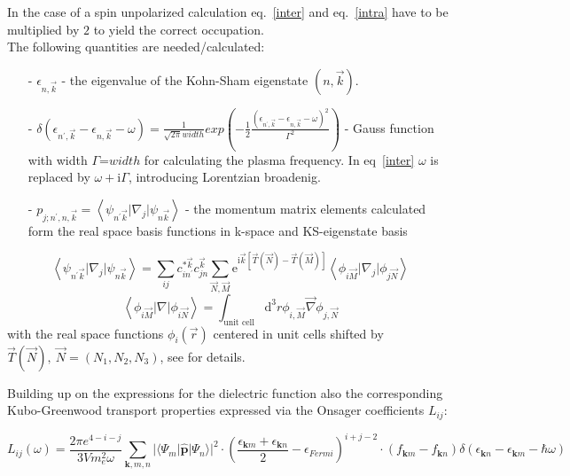 In the case of a spin unpolarized calculation eq.~\ref{inter} and eq.~\ref{intra} have to be multiplied by $2$ to yield the correct occupation.\\
The following quantities are needed/calculated:
\begin{itemize}
 \item[-] $\epsilon_{n,\vec{k}}$ - the eigenvalue of the Kohn-Sham eigenstate $(n,\vec{k})$.
 \item[-] $\delta(\epsilon_{n^{'},\vec{k}}-\epsilon_{n,\vec{k}}-\omega)=\frac{1}{\sqrt{2\pi}width}exp\left(-\frac{1}{2}\frac{(\epsilon_{n^{'},\vec{k}}-\epsilon_{n,\vec{k}}-\omega)^2}{\Gamma^2}\right)$ - Gauss function with width $\Gamma$=$width$ for calculating the plasma frequency. In eq~\ref{inter} $\omega$ is replaced by $\omega+\mathrm{i}\Gamma$, introducing Lorentzian broadenig.
 \item[-] $p_{j;n^{'},n,\vec{k}}=\left\langle\psi_{n^{'}\vec{k}}\vert\nabla_j\vert\psi_{n\vec{k}}\right\rangle$ - the momentum matrix elements calculated form the real space basis 
functions in k-space and KS-eigenstate basis
\end{itemize}
\begin{equation}
 \left\langle\psi_{n^{'}\vec{k}}\vert\nabla_j\vert\psi_{n\vec{k}}\right\rangle=\sum_{ij}c_{in^{'}}^{*\vec{k}}c_{jn}^{\vec{k}}\sum_{\vec{N},\vec{M}}\mathrm{e}^{\mathrm{i}\vec{k}\left[\vec{T}\left(\vec{N}\right)-\vec{T}\left(\vec{M}\right)\right]}\left\langle\phi_{i\vec{M}}\vert\nabla_j\vert\phi_{j\vec{N}}\right\rangle
\end{equation}
\begin{equation}
 \left\langle\phi_{i\vec{M}}\vert\nabla\vert\phi_{i\vec{N}}\right\rangle=\int_{\text{unit cell}}\mathrm{d}^3 r \phi_{i,\vec{M}}\vec{\nabla}\phi_{j,\vec{N}}
\end{equation}
with the real space functions $\phi_i(\vec{r})$ centered in unit cells shifted by $\vec{T}\left(\vec{N}\right),~\vec{N}=(N_1, N_2, N_3)$, see \cite{Blum08} for details.

Building up on the expressions for the dielectric function also the corresponding Kubo-Greenwood transport properties expressed via the Onsager coefficients $L_{ij}$: 

\begin{equation}
 L_{ij}(\omega) = \frac{2\pi e^{4-i-j}}{3V m^2_e \omega} \sum_{\bm{k},m,n} | \langle \Psi_m |\bm{\hat{p}} | \Psi_n \rangle|^2 \cdot   \left( \frac{\epsilon_{\bm{k}m} + \epsilon_{\bm{k}n}}{2} -\epsilon_{Fermi}   \right)^{i+j-2}   \cdot   \left(f_{\bm{k}m}-f_{\bm{k}n}\right)  \delta\left(\epsilon_{\bm{k}n}-\epsilon_{\bm{k}m}-\hbar \omega \right) 
\end{equation}

